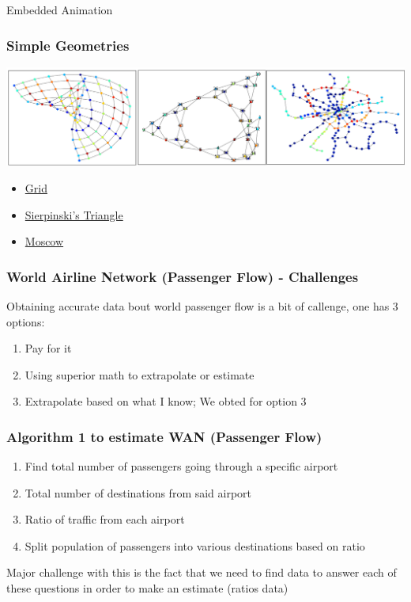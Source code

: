 \documentclass{beamer}
\begin{document}
\begin{frame}{Embedded Animation}
\frametitle{Simple Geometries}
\includegraphics[width=1.0\textwidth]{Scratch_Visuals/geometries_example.png}
\begin{itemize}
    \item \href{https://github.com/cheung-ho-lum/NS_Epidemics_ABM_Approach/blob/master/Repository/Visualizations/infection_timelapse_grid_01.gif}{Grid}
    \item \href{https://github.com/cheung-ho-lum/NS_Epidemics_ABM_Approach/blob/master/Repository/Visualizations/infection_timelapse_sierpinski_01.gif}{Sierpinski's Triangle}
    \item \href{https://github.com/cheung-ho-lum/NS_Epidemics_ABM_Approach/blob/master/Repository/Visualizations/infection_timelapse_moscow.gif}{Moscow}
\end{itemize}
\end{frame}


\begin{frame}
\frametitle{World Airline Network (Passenger Flow) - Challenges}
Obtaining accurate data bout world passenger flow is a bit of callenge, one has 3 options:
\begin{enumerate}
	\item Pay for it
	\item Using superior math to extrapolate or estimate
	\item Extrapolate based on what I know; We obted for option 3 
\end{enumerate}
\end{frame}
\begin{frame}
\frametitle{Algorithm 1 to estimate WAN (Passenger Flow)}
\begin{enumerate}
	\item Find total number of passengers going through a specific airport
	\item Total number of destinations from said airport
	\item Ratio of traffic from each airport
	\item Split population of passengers into various destinations based on ratio 
\end{enumerate}
Major challenge with this is the fact that we need to find data to answer each of these questions  in order to make an estimate (ratios data)
\end{frame}
\end{document}
